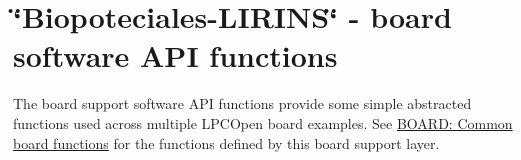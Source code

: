 \hypertarget{group__BOARD}{}\section{\char`\"{}\+Biopoteciales-\/\+L\+I\+R\+I\+N\+S\char`\"{} -\/ board software A\+PI functions}
\label{group__BOARD}
The board support software A\+PI functions provide some simple abstracted functions used across multiple L\+P\+C\+Open board examples. See \hyperlink{group__BOARD__COMMON__API}{B\+O\+A\+R\+D\+: Common board functions} for the functions defined by this board support layer.~\newline
 